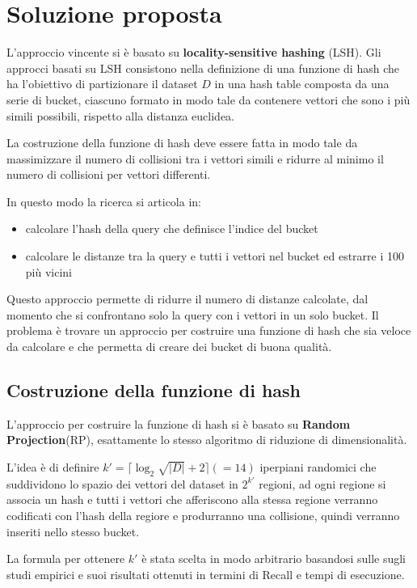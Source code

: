 \chapter{Soluzione proposta}
L'approccio vincente si è basato su \textbf{locality-sensitive hashing} (LSH).
Gli approcci basati su LSH consistono nella definizione di una funzione di hash 
che ha l'obiettivo di partizionare il dataset $D$ in una hash table composta 
da una serie di bucket, ciascuno 
formato in modo tale da contenere vettori che sono i più simili possibili, rispetto 
alla distanza euclidea. 

La costruzione della funzione di hash deve essere fatta in modo tale da 
massimizzare il numero di collisioni tra i vettori simili e ridurre al minimo 
il numero di collisioni per vettori differenti. 

In questo modo la ricerca si articola in:
\begin{itemize}
    \item calcolare l'hash della query che definisce l'indice del bucket
    \item calcolare le distanze tra la query e tutti i vettori nel bucket ed 
    estrarre i 100 più vicini
\end{itemize} 

Questo approccio permette di ridurre il numero di distanze calcolate, dal momento 
che si confrontano solo la query con i vettori in un solo bucket. Il problema è trovare 
un approccio per costruire una funzione di hash che sia veloce da calcolare e 
che permetta di creare dei bucket di buona qualità.

\section{Costruzione della funzione di hash}

L'approccio per costruire la funzione di hash si è basato su \textbf{Random Projection}(RP),
esattamente lo stesso algoritmo di riduzione di dimensionalità. 

L'idea è di definire $k' = \lceil \log_2{\sqrt{|D|}} + 2\rceil (= 14)$  iperpiani randomici che suddividono
lo spazio dei vettori del dataset in $2^{k'}$ regioni, ad ogni regione si associa 
un hash e tutti i vettori che afferiscono alla stessa regione verranno codificati 
con l'hash della regiore e produrranno una collisione, quindi verranno inseriti 
nello stesso bucket.

\begin{nota}
    La formula per ottenere $k'$ è stata scelta in modo arbitrario basandosi sulle 
    sugli studi empirici e suoi risultati ottenuti in termini di Recall e tempi
    di esecuzione.
\end{nota}


